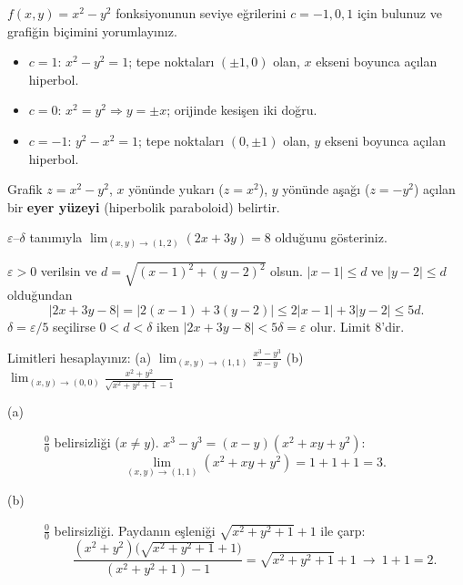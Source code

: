 \begin{soru}
$f(x,y)=x^2-y^2$ fonksiyonunun seviye eğrilerini $c=-1,0,1$ için bulunuz ve grafiğin biçimini yorumlayınız.
\end{soru}
\begin{cevap}
\begin{itemize}
  \item $c=1$: $x^2-y^2=1$; tepe noktaları $(\pm1,0)$ olan, $x$ ekseni boyunca açılan hiperbol.
  \item $c=0$: $x^2=y^2\Rightarrow y=\pm x$; orijinde kesişen iki doğru.
  \item $c=-1$: $y^2-x^2=1$; tepe noktaları $(0,\pm1)$ olan, $y$ ekseni boyunca açılan hiperbol.
\end{itemize}
Grafik $z=x^2-y^2$, $x$ yönünde yukarı ($z=x^2$), $y$ yönünde aşağı ($z=-y^2$) açılan bir \textbf{eyer yüzeyi}
(hiperbolik paraboloid) belirtir.
\end{cevap}

\begin{soru}
$\varepsilon$--$\delta$ tanımıyla $\displaystyle\lim_{(x,y)\to(1,2)}(2x+3y)=8$ olduğunu gösteriniz.
\end{soru}
\begin{cevap}
$\varepsilon>0$ verilsin ve $d=\sqrt{(x-1)^2+(y-2)^2}$ olsun. $|x-1|\le d$ ve $|y-2|\le d$ olduğundan
\[
|2x+3y-8|=|2(x-1)+3(y-2)|\le2|x-1|+3|y-2|\le5d .
\]
$\delta=\varepsilon/5$ seçilirse $0<d<\delta$ iken $|2x+3y-8|<5\delta=\varepsilon$ olur. Limit $8$'dir.
\end{cevap}

\begin{soru}
Limitleri hesaplayınız:
(a) $\displaystyle\lim_{(x,y)\to(1,1)}\frac{x^3-y^3}{x-y}$ \qquad
(b) $\displaystyle\lim_{(x,y)\to(0,0)}\frac{x^2+y^2}{\sqrt{x^2+y^2+1}-1}$
\end{soru}
\begin{cevap}
\begin{description}
  \item[(a)] $\frac00$ belirsizliği ($x\neq y$). $x^3-y^3=(x-y)(x^2+xy+y^2)$:
  \[
  \lim_{(x,y)\to(1,1)}(x^2+xy+y^2)=1+1+1=3 .
  \]
  \item[(b)] $\frac00$ belirsizliği. Paydanın eşleniği $\sqrt{x^2+y^2+1}+1$ ile çarp:
  \[
  \frac{(x^2+y^2)\big(\sqrt{x^2+y^2+1}+1\big)}{(x^2+y^2+1)-1}=\sqrt{x^2+y^2+1}+1\ \longrightarrow\ 1+1=2 .
  \]
\end{description}
\end{cevap}

